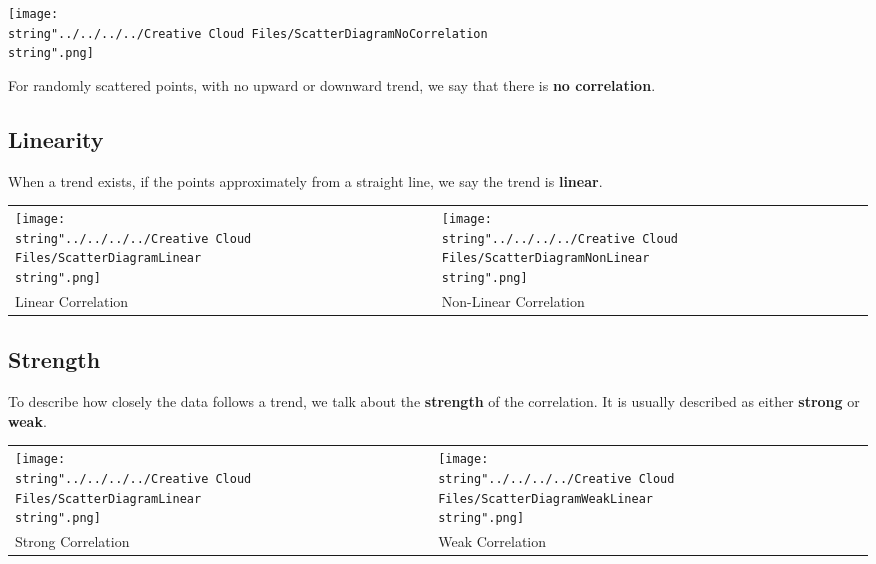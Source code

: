 \documentclass[11pt,a4paper]{book}
\begin{document}
\begin{minipage}{.35\textwidth}
\begin{center}
\texttt{[image: \\string"../../../../Creative Cloud Files/ScatterDiagramNoCorrelation\\string".png]}
\par\end{center}

\end{minipage}
\begin{minipage}{.6\textwidth}

For randomly scattered points, with no upward or downward trend, we
say that there is \textbf{no correlation}.

\end{minipage}

\subsection{Linearity}

When a trend exists, if the points approximately from a straight line,
we say the trend is \textbf{linear}.
\begin{center}
\begin{tabular}{>{\centering}p{5cm}>{\centering}p{1cm}>{\centering}p{5cm}}
\centering{}\texttt{[image: \\string"../../../../Creative Cloud Files/ScatterDiagramLinear\\string".png]} &  & \centering{}\texttt{[image: \\string"../../../../Creative Cloud Files/ScatterDiagramNonLinear\\string".png]}\tabularnewline
Linear Correlation &  & Non-Linear Correlation\tabularnewline
\end{tabular}
\par\end{center}

\subsection{Strength}

To describe how closely the data follows a trend, we talk about the
\textbf{strength} of the correlation. It is usually described as either
\textbf{strong} or \textbf{weak}.
\begin{center}
\begin{tabular}{>{\centering}p{5cm}>{\centering}p{1cm}>{\centering}p{5cm}}
\centering{}\texttt{[image: \\string"../../../../Creative Cloud Files/ScatterDiagramLinear\\string".png]} &  & \centering{}\texttt{[image: \\string"../../../../Creative Cloud Files/ScatterDiagramWeakLinear\\string".png]}\tabularnewline
Strong Correlation &  & Weak Correlation\tabularnewline
\end{tabular}
\par\end{center}
\end{document}
